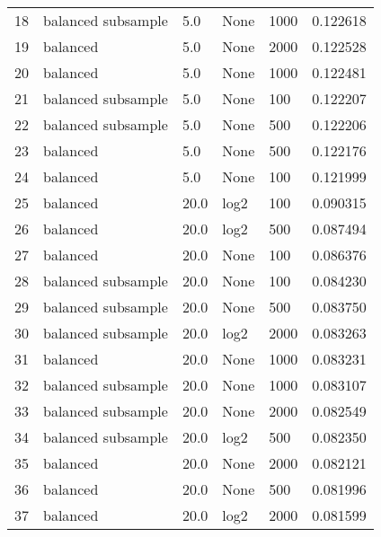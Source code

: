 \documentclass[
    iict, %
    il, %
]{heig-tb}
\begin{document}
\begin{table}[H]
\begin{center}
\begin{tabular}{llllll}
            18   & balanced subsample & 5.0       & None         & 1000         & 0.122618 \\
            19   & balanced           & 5.0       & None         & 2000         & 0.122528 \\
            20   & balanced           & 5.0       & None         & 1000         & 0.122481 \\
            21   & balanced subsample & 5.0       & None         & 100          & 0.122207 \\
            22   & balanced subsample & 5.0       & None         & 500          & 0.122206 \\
            23   & balanced           & 5.0       & None         & 500          & 0.122176 \\
            24   & balanced           & 5.0       & None         & 100          & 0.121999 \\
            25   & balanced           & 20.0      & log2         & 100          & 0.090315 \\
            26   & balanced           & 20.0      & log2         & 500          & 0.087494 \\
            27   & balanced           & 20.0      & None         & 100          & 0.086376 \\
            28   & balanced subsample & 20.0      & None         & 100          & 0.084230 \\
            29   & balanced subsample & 20.0      & None         & 500          & 0.083750 \\
            30   & balanced subsample & 20.0      & log2         & 2000         & 0.083263 \\
            31   & balanced           & 20.0      & None         & 1000         & 0.083231 \\
            32   & balanced subsample & 20.0      & None         & 1000         & 0.083107 \\
            33   & balanced subsample & 20.0      & None         & 2000         & 0.082549 \\
            34   & balanced subsample & 20.0      & log2         & 500          & 0.082350 \\
            35   & balanced           & 20.0      & None         & 2000         & 0.082121 \\
            36   & balanced           & 20.0      & None         & 500          & 0.081996 \\
            37   & balanced           & 20.0      & log2         & 2000         & 0.081599 \\

\end{tabular}
\end{center}
\end{table}
\end{document}
